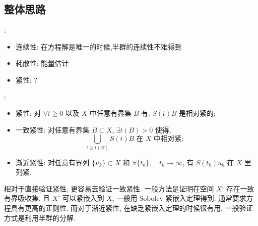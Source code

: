 \documentclass[UTF8]{ctexbeamer}
\newcommand*\Brace[1]{\lbrace#1\rbrace}
\begin{document}
\subsection{整体思路}
\begin{frame}{\secname : \subsecname}

    \begin{itemize}
        \item 连续性: 在方程解是唯一的时候,半群的连续性不难得到
        \item 耗散性: 能量估计
        \item 紧性: ?
    \end{itemize}

\end{frame}
\begin{frame}{\secname : \subsecname}

    \begin{itemize}
        \item 紧性: 对 $\forall t \geq 0$ 以及 $X$ 中任意有界集 $B$ 有, $S(t)B$ 是相对紧的;
        \item 一致紧性: 对任意有界集 $B \subset X$, $\exists t(B) > 0$ 使得,
        \begin{equation*}
            \bigcup_{t \geq t(B)} S(t)B \text{ 在 } X \text{ 中相对紧};
        \end{equation*}
        \item 渐近紧性: 对任意有界列 $\Brace{u_k} \subset X$ 和
        $\forall \Brace{t_k}, \quad t_k \to \infty$, 有 $S(t_k)u_k$ 在 $X$ 里列紧.
    \end{itemize}

    相对于直接验证紧性, 更容易去验证一致紧性.
    一般方法是证明在空间 $X‘$ 存在一致有界吸收集, 且 $X'$ 可以紧嵌入到 $X$,
    一般用 Sobolev 紧嵌入定理得到. 通常要求方程具有更高的正则性. 而对于渐近紧性,
    在缺乏紧嵌入定理的时候很有用, 一般验证方式是利用半群的分解.

\end{frame}
\end{document}
